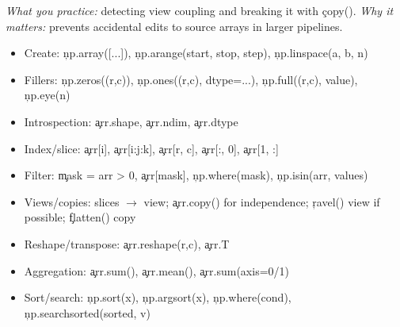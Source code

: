 
\textit{What you practice:} detecting view coupling and breaking it with \c{copy()}.  
\textit{Why it matters:} prevents accidental edits to source arrays in larger pipelines.



\begin{itemize}
\item Create: \c{np.array([...])}, \c{np.arange(start, stop, step)}, \c{np.linspace(a, b, n)}
\item Fillers: \c{np.zeros((r,c))}, \c{np.ones((r,c), dtype=...)}, \c{np.full((r,c), value)}, \c{np.eye(n)}
\item Introspection: \c{arr.shape}, \c{arr.ndim}, \c{arr.dtype}
\item Index/slice: \c{arr[i]}, \c{arr[i:j:k]}, \c{arr[r, c]}, \c{arr[:, 0]}, \c{arr[1, :]}
\item Filter: \c{mask = arr > 0}, \c{arr[mask]}, \c{np.where(mask)}, \c{np.isin(arr, values)}
\item Views/copies: slices $\to$ view; \c{arr.copy()} for independence; \c{ravel()} view if possible; \c{flatten()} copy
\item Reshape/transpose: \c{arr.reshape(r,c)}, \c{arr.T}
\item Aggregation: \c{arr.sum()}, \c{arr.mean()}, \c{arr.sum(axis=0/1)}
\item Sort/search: \c{np.sort(x)}, \c{np.argsort(x)}, \c{np.where(cond)}, \c{np.searchsorted(sorted, v)}
\end{itemize}

